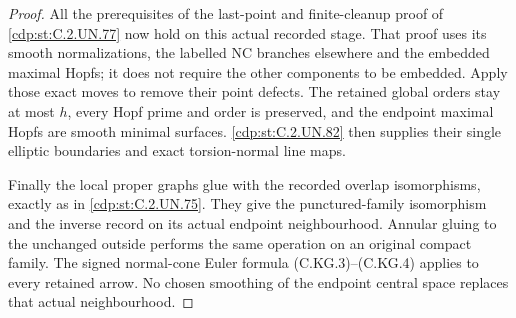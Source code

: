 \begin{proof}
All the prerequisites of the last-point and
finite-cleanup proof of \ref{cdp:st:C.2.UN.77} now hold on this
actual recorded stage. That proof uses its
smooth normalizations, the labelled NC branches
elsewhere and the embedded maximal Hopfs; it
does not require the other components to be
embedded. Apply those exact moves to remove
their point defects. The retained global orders
stay at most \(h\), every Hopf prime and order
is preserved, and the endpoint maximal Hopfs
are smooth minimal surfaces. \ref{cdp:st:C.2.UN.82} then supplies
their single elliptic boundaries and exact
torsion-normal line maps.

Finally the local proper graphs glue with the
recorded overlap isomorphisms, exactly as in
\ref{cdp:st:C.2.UN.75}. They give the punctured-family isomorphism
and the inverse record on its actual endpoint
neighbourhood. Annular gluing to the unchanged
outside performs the same operation on an
original compact family. The signed normal-cone
Euler formula (C.KG.3)--(C.KG.4) applies to
every retained arrow. No chosen smoothing of
the endpoint central space replaces that
actual neighbourhood.
\end{proof}


